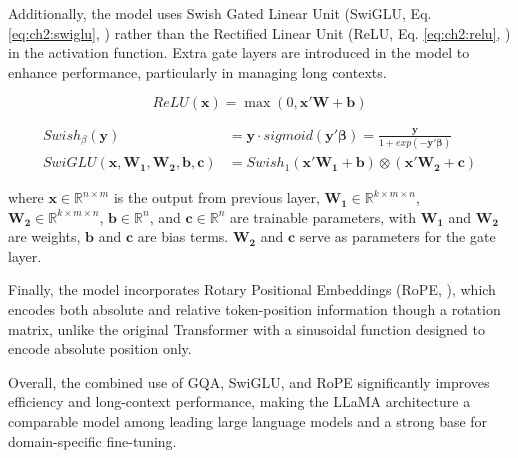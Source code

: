 Additionally, the model uses Swish Gated Linear Unit (SwiGLU, Eq. \eqref{eq:ch2:swiglu}, \cite{shazeer2020glu}) rather than the Rectified Linear Unit (ReLU, Eq. \eqref{eq:ch2:relu}, \cite{glorot2011deep}) in the activation function. Extra gate layers are introduced in the model to enhance performance, particularly in managing long contexts.



\begin{equation}\label{eq:ch2:relu}
    ReLU (\mathbf {x} )=\max(0,\mathbf {x} '\mathbf{W} + \mathbf{b})
\end{equation}


\begin{equation}\label{eq:ch2:swiglu}
    \begin{split}
        Swish_{\beta}(\mathbf{y}) &= \mathbf{y} \cdot sigmoid(\mathbf{y}' \mathbf{\beta}) = \frac{\mathbf{y}}{1 + exp(-\mathbf{y}' \mathbf{\beta})} \\
        SwiGLU(\mathbf{x}, \mathbf{W_1}, \mathbf{W_2}, \mathbf{b}, \mathbf{c}) &= Swish_{1}(\mathbf{x}' \mathbf{W_1} + \mathbf{b}) \otimes (\mathbf{x}' \mathbf{W_2} + \mathbf{c})
    \end{split}
\end{equation}


where $\mathbf{x} \in \mathbb{R}^{n \times m}$ is the output from previous layer, $\mathbf{W_1} \in \mathbb{R}^{k \times m \times n}$, $\mathbf{W_2} \in \mathbb{R}^{k \times m \times n}$, $\mathbf{b} \in \mathbb{R}^{n}$, and $\mathbf{c} \in \mathbb{R}^{n}$ are trainable parameters, with $\mathbf{W_1}$ and $\mathbf{W_2}$ are weights, $\mathbf{b}$ and $\mathbf{c}$ are bias terms. $\mathbf{W_2}$ and $\mathbf{c}$ serve as parameters for the gate layer.






Finally, the model incorporates Rotary Positional Embeddings (RoPE, \cite{su2024roformer}), which encodes both absolute and relative token-position information though a rotation matrix, unlike the original Transformer with a sinusoidal function designed to encode absolute position only.


Overall, the combined use of GQA, SwiGLU, and RoPE significantly improves efficiency and long-context performance, making the LLaMA architecture a comparable model among leading large language models and a strong base for domain-specific fine-tuning.


